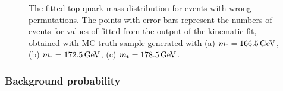 \begin{figure}[!htpb]
	\centering
	\hfill
	\caption[Fitted top quark mass distribution for \ttbar events with wrong permutations]{The fitted top quark mass
	distribution for \ttbar events with wrong permutations. The points with error bars represent the numbers of events
	for values of fitted \mtop from the output of the kinematic fit, obtained with MC truth sample generated with (a)
	$\mtop=\SI{166.5}{\GeV}$, (b) $\mtop=\SI{172.5}{\GeV}$, (c) $\mtop=\SI{178.5}{\GeV}$.}
	\label{fig:fitted_ttbar_wp_density}
\end{figure}

\subsubsection*{Background probability}

